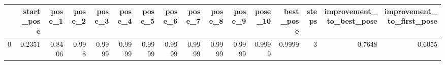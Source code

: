 \begin{tabular}{lrrrrrrrrrrrrrrr}
\toprule
{} &  start\_pose &  pose\_1 &  pose\_2 &  pose\_3 &  pose\_4 &  pose\_5 &  pose\_6 &  pose\_7 &  pose\_8 &  pose\_9 &  pose\_10 &  best\_pose &  steps &  improvement\_to\_best\_pose &  improvement\_to\_first\_pose \\
\midrule
0 &      0.2351 &  0.8406 &   0.998 &  0.9999 &  0.9999 &  0.9999 &  0.9999 &  0.9999 &  0.9999 &  0.9999 &   0.9999 &     0.9999 &      3 &                    0.7648 &                     0.6055 \\
\bottomrule
\end{tabular}
